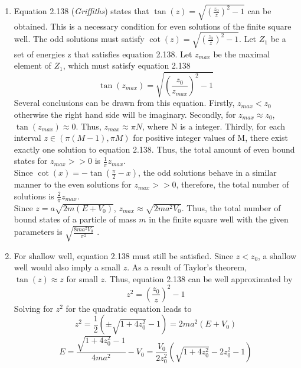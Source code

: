 \begin{sol}
\begin{enumerate}[label=\textbf{(\alph*)}]
	\item
    Equation 2.138 (\textit{Griffiths}) states that $\tan(z)=\sqrt{(\frac{z_0}{z})^2-1}$ can be obtained. This is a necessary condition for even solutions of the finite square well. The odd solutions must satisfy $\cot(z)=\sqrt{(\frac{z_0}{z})^2-1}$. Let $Z_1$ be a set of energies z that satisfies equation 2.138. Let $z_{max}$ be the maximal element of $Z_1$, which must satisfy equation 2.138
    \begin{equation}
        \tan(z_{max})=\sqrt{\left(\frac{z_0}{z_{max}}\right)^2-1}
    \end{equation}
    Several conclusions can be drawn from this equation. Firstly, $z_{max}<z_0$ otherwise the right hand side will be imaginary. Secondly, for $z_{max}\approx z_0$, $\tan(z_{max})\approx 0$. Thus, $z_{max}\approx\pi N$, where N is a integer. Thirdly, for each interval $z\in(\pi (M-1), \pi M)$ for positive integer values of M, there exist exactly one solution to equation 2.138. Thus, the total amount of even bound states  for $z_{max}>>0$ is  $\frac{1}{\pi}z_{max}$.\\Since $\cot(x)=-\tan(\frac{\pi}{2}-x)$, the odd solutions behave in a similar manner to the even solutions for $z_{max}>>0$, therefore, the total number of solutions is $\frac{2}{\pi}z_{max}$.
    \\Since $z=a\sqrt{2m(E+V_0)}$, $z_{max}\approx \sqrt{2ma^2V_0}$. Thus, the total number of bound states of a particle of mass $m$ in the finite square well with the given parameters is $\displaystyle{\sqrt{\frac{8ma^2V_0}{\pi^2}}}$ .
    \item For shallow well, equation 2.138 must still be satisfied. Since $z<z_0$, a shallow well would also imply a small $z$. As a result of Taylor's theorem, $\tan(z)\approx z$ for small $z$. Thus, equation 2.138 can be well approximated by
    \begin{equation}
        z^2=(\frac{z_0}{z})^2-1
    \end{equation}
    Solving for $z^2$ for the quadratic equation leads to 
    \begin{equation}
        z^2=\frac{1}{2}(\pm\sqrt{1+4z_0 ^2}-1)=2ma^2(E+V_0)
    \end{equation}
    \begin{equation}
        E=\frac{\sqrt{1+4z_0 ^2}-1}{4ma^2}-V_0=\frac{V_0}{2z_0^2}(\sqrt{1+4z_0 ^2}-2z_0^2-1)
    \end{equation}
\end{enumerate}
\end{sol}